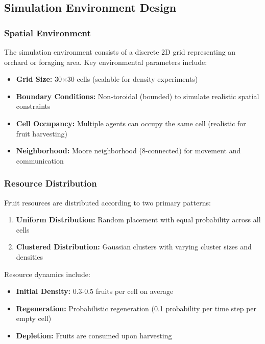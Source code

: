 \documentclass[12pt,a4paper]{article}
\begin{document}
\subsection{Simulation Environment Design}

\subsubsection{Spatial Environment}

The simulation environment consists of a discrete 2D grid representing an orchard or foraging area. Key environmental parameters include:

\begin{itemize}
    \item \textbf{Grid Size:} 30×30 cells (scalable for density experiments)
    \item \textbf{Boundary Conditions:} Non-toroidal (bounded) to simulate realistic spatial constraints
    \item \textbf{Cell Occupancy:} Multiple agents can occupy the same cell (realistic for fruit harvesting)
    \item \textbf{Neighborhood:} Moore neighborhood (8-connected) for movement and communication
\end{itemize}

\subsubsection{Resource Distribution}

Fruit resources are distributed according to two primary patterns:

\begin{enumerate}
    \item \textbf{Uniform Distribution:} Random placement with equal probability across all cells
    \item \textbf{Clustered Distribution:} Gaussian clusters with varying cluster sizes and densities
\end{enumerate}

Resource dynamics include:
\begin{itemize}
    \item \textbf{Initial Density:} 0.3-0.5 fruits per cell on average
    \item \textbf{Regeneration:} Probabilistic regeneration (0.1 probability per time step per empty cell)
    \item \textbf{Depletion:} Fruits are consumed upon harvesting
\end{itemize}
\end{document}
